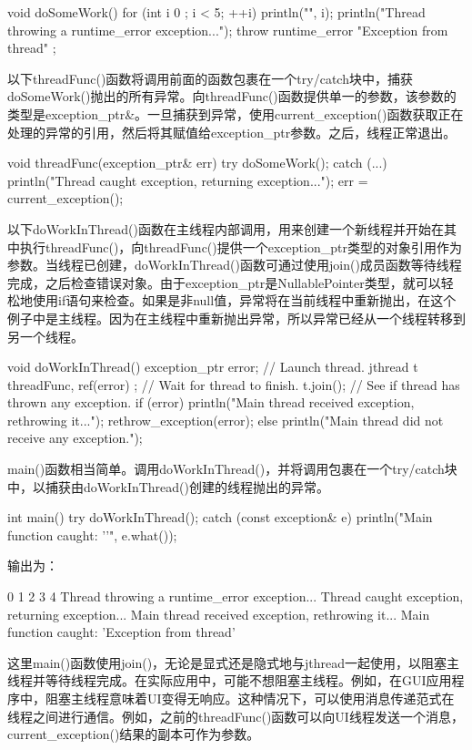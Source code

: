 \begin{cpp}
void doSomeWork()
{
    for (int i { 0 }; i < 5; ++i) { println("{}", i); }
    println("Thread throwing a runtime_error exception...");
    throw runtime_error { "Exception from thread" };
}
\end{cpp}

以下threadFunc()函数将调用前面的函数包裹在一个try/catch块中，捕获doSomeWork()抛出的所有异常。向threadFunc()函数提供单一的参数，该参数的类型是exception\_ptr\&。一旦捕获到异常，使用current\_exception()函数获取正在处理的异常的引用，然后将其赋值给exception\_ptr参数。之后，线程正常退出。

\begin{cpp}
void threadFunc(exception_ptr& err)
{
    try {
        doSomeWork();
    } catch (...) {
        println("Thread caught exception, returning exception...");
        err = current_exception();
    }
}
\end{cpp}

以下doWorkInThread()函数在主线程内部调用，用来创建一个新线程并开始在其中执行threadFunc()，向threadFunc()提供一个exception\_ptr类型的对象引用作为参数。当线程已创建，doWorkInThread()函数可通过使用join()成员函数等待线程完成，之后检查错误对象。由于exception\_ptr是NullablePointer类型，就可以轻松地使用if语句来检查。如果是非null值，异常将在当前线程中重新抛出，在这个例子中是主线程。因为在主线程中重新抛出异常，所以异常已经从一个线程转移到另一个线程。

\begin{cpp}
void doWorkInThread()
{
    exception_ptr error;
    // Launch thread.
    jthread t { threadFunc, ref(error) };
    // Wait for thread to finish.
    t.join();
    // See if thread has thrown any exception.
    if (error) {
        println("Main thread received exception, rethrowing it...");
        rethrow_exception(error);
    } else {
        println("Main thread did not receive any exception.");
    }
}
\end{cpp}

main()函数相当简单。调用doWorkInThread()，并将调用包裹在一个try/catch块中，以捕获由doWorkInThread()创建的线程抛出的异常。

\begin{cpp}
int main()
{
    try {
        doWorkInThread();
    } catch (const exception& e) {
        println("Main function caught: '{}'", e.what());
    }
}
\end{cpp}

输出为：

\begin{shell}
0
1
2
3
4
Thread throwing a runtime_error exception...
Thread caught exception, returning exception...
Main thread received exception, rethrowing it...
Main function caught: 'Exception from thread'
\end{shell}

这里main()函数使用join()，无论是显式还是隐式地与jthread一起使用，以阻塞主线程并等待线程完成。在实际应用中，可能不想阻塞主线程。例如，在GUI应用程序中，阻塞主线程意味着UI变得无响应。这种情况下，可以使用消息传递范式在线程之间进行通信。例如，之前的threadFunc()函数可以向UI线程发送一个消息，current\_exception()结果的副本可作为参数。



